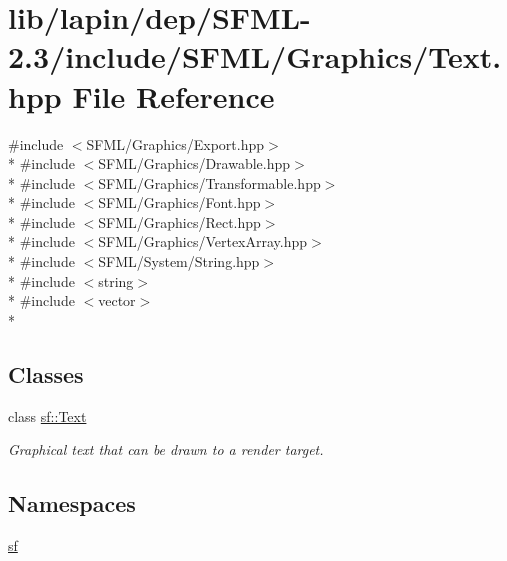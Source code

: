 \hypertarget{lib_2lapin_2dep_2_s_f_m_l-2_83_2include_2_s_f_m_l_2_graphics_2_text_8hpp}{\section{lib/lapin/dep/\-S\-F\-M\-L-\/2.3/include/\-S\-F\-M\-L/\-Graphics/\-Text.hpp File Reference}
\label{lib_2lapin_2dep_2_s_f_m_l-2_83_2include_2_s_f_m_l_2_graphics_2_text_8hpp}
}
{\ttfamily \#include $<$S\-F\-M\-L/\-Graphics/\-Export.\-hpp$>$}\\*
{\ttfamily \#include $<$S\-F\-M\-L/\-Graphics/\-Drawable.\-hpp$>$}\\*
{\ttfamily \#include $<$S\-F\-M\-L/\-Graphics/\-Transformable.\-hpp$>$}\\*
{\ttfamily \#include $<$S\-F\-M\-L/\-Graphics/\-Font.\-hpp$>$}\\*
{\ttfamily \#include $<$S\-F\-M\-L/\-Graphics/\-Rect.\-hpp$>$}\\*
{\ttfamily \#include $<$S\-F\-M\-L/\-Graphics/\-Vertex\-Array.\-hpp$>$}\\*
{\ttfamily \#include $<$S\-F\-M\-L/\-System/\-String.\-hpp$>$}\\*
{\ttfamily \#include $<$string$>$}\\*
{\ttfamily \#include $<$vector$>$}\\*
\subsection*{Classes}
\begin{DoxyCompactItemize}
\item 
class \hyperlink{classsf_1_1_text}{sf\-::\-Text}
\begin{DoxyCompactList}\small\item\em Graphical text that can be drawn to a render target. \end{DoxyCompactList}\end{DoxyCompactItemize}
\subsection*{Namespaces}
\begin{DoxyCompactItemize}
\item 
\hyperlink{namespacesf}{sf}
\end{DoxyCompactItemize}

